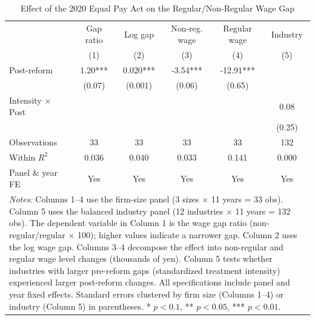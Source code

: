 \begin{table}[t]
\centering
\caption{Effect of the 2020 Equal Pay Act on the Regular/Non-Regular Wage Gap}
\label{tab:main}
\small
\begin{tabular}{lccccc}
\toprule
 & Gap ratio & Log gap & Non-reg. wage & Regular wage & Industry \\
 & (1) & (2) & (3) & (4) & (5) \\
\midrule
Post-reform & 1.20*** & 0.020*** & -3.54*** & -12.91*** & \\
 & (0.07) & (0.001) & (0.06) & (0.65) & \\
Intensity $\times$ Post & & & & & 0.08 \\
 & & & & & (0.25) \\
\midrule
Observations & 33 & 33 & 33 & 33 & 132 \\
Within $R^2$ & 0.036 & 0.040 & 0.033 & 0.141 & 0.000 \\
Panel \& year FE & Yes & Yes & Yes & Yes & Yes \\
\bottomrule
\multicolumn{6}{p{0.98\textwidth}}{\footnotesize \textit{Notes:} Columns 1--4 use the firm-size panel (3 sizes $\times$ 11 years = 33 obs). Column 5 uses the balanced industry panel (12 industries $\times$ 11 years = 132 obs). The dependent variable in Column 1 is the wage gap ratio (non-regular/regular $\times$ 100); higher values indicate a narrower gap. Column 2 uses the log wage gap. Columns 3--4 decompose the effect into non-regular and regular wage level changes (thousands of yen). Column 5 tests whether industries with larger pre-reform gaps (standardized treatment intensity) experienced larger post-reform changes. All specifications include panel and year fixed effects. Standard errors clustered by firm size (Columns 1--4) or industry (Column 5) in parentheses. * $p<0.1$, ** $p<0.05$, *** $p<0.01$.} \\
\end{tabular}
\end{table}
